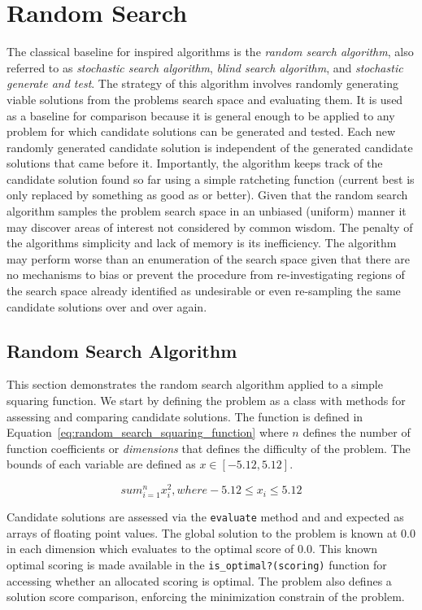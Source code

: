 \section{Random Search}
The classical baseline for inspired algorithms is the \emph{random search algorithm}, also referred to as \emph{stochastic search algorithm}, \emph{blind search algorithm}, and \emph{stochastic generate and test}. The strategy of this algorithm involves randomly generating viable solutions from the problems search space and evaluating them. It is used as a baseline for comparison because it is general enough to be applied to any problem for which candidate solutions can be generated and tested. Each new randomly generated candidate solution is independent of the generated candidate solutions that came before it. Importantly, the algorithm keeps track of the candidate solution found so far using a simple ratcheting function (current best is only replaced by something as good as or better). Given that the random search algorithm samples the problem search space in an unbiased (uniform) manner it may discover areas of interest not considered by common wisdom. The penalty of the algorithms simplicity and lack of memory is its inefficiency. The algorithm may perform worse than an enumeration of the search space given that there are no mechanisms to bias or prevent the procedure from re-investigating regions of the search space already identified as undesirable or even re-sampling the same candidate solutions over and over again.

\subsection{Random Search Algorithm}
This section demonstrates the random search algorithm applied to a simple squaring function. We start by defining the problem as a class with methods for assessing and comparing candidate solutions. The function is defined in Equation~\ref{eq:random_search_squaring_function} where $n$ defines the number of function coefficients or \emph{dimensions} that defines the difficulty of the problem. The bounds of each variable are defined as $x \in [-5.12,5.12]$. 

\begin{equation}
	sum_{i=1}^n x_{i}^2, where -5.12 \leq x_i \leq 5.12
	\label{eq:random_search_squaring_function}
\end{equation}

Candidate solutions are assessed via the \texttt{evaluate} method and and expected as arrays of floating point values. The global solution to the problem is known at $0.0$ in each dimension which evaluates to the optimal score of $0.0$. This known optimal scoring is made available in the \texttt{is\_optimal?(scoring)} function for accessing whether an allocated scoring is optimal. The problem also defines a solution score comparison, enforcing the minimization constrain of the problem.

